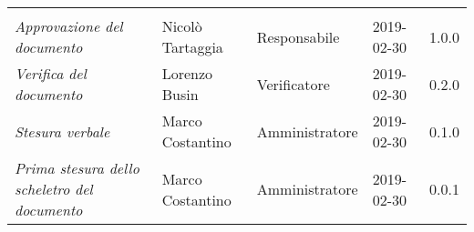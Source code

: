 \newpage 
\section*{}
\begin{table}[H]
	\centering
	\begin{tabular}{p{4cm}|C{3cm}|C{3cm}|R{2.5cm}|R{2cm}}
		
		 & & & & \\
		
		
		\emph{Approvazione del documento} & Nicolò Tartaggia & Responsabile & 2019-02-30 & 1.0.0 \\
		\hline
		
		\emph{Verifica del documento} & Lorenzo Busin & Verificatore & 2019-02-30 & 0.2.0 \\
		\hline


		\emph{Stesura verbale} & Marco Costantino & Amministratore & 2019-02-30 & 0.1.0 \\
		\hline
		
		\emph{Prima stesura dello scheletro del documento} & Marco Costantino & Amministratore & 2019-02-30 & 0.0.1 \\
		
	\end{tabular}
	
\end{table}


\clearpage